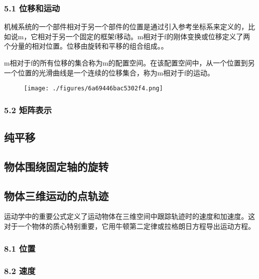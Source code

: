 \subsubsection{5.1 位移和运动}

机械系统的一个部件相对于另一个部件的位置是通过引入参考坐标系来定义的，比如说m，它相对于另一个固定的框架f移动。m相对于f的刚体变换或位移定义了两个分量的相对位置。位移由旋转和平移的组合组成。。

m相对于f的所有位移的集合称为m的配置空间。在该配置空间中，从一个位置到另一个位置的光滑曲线是一个连续的位移集合，称为m相对于f的运动。

\begin{figure}[ht]
\centering
\texttt{[image: ./figures/6a69446bac5302f4.png]}
\caption \label{fig_YDX_2}
\end{figure}

\subsubsection{5.2 矩阵表示}



\subsection{纯平移}



\subsection{ 物体围绕固定轴的旋转}



\subsection{物体三维运动的点轨迹}

运动学中的重要公式定义了运动物体在三维空间中跟踪轨迹时的速度和加速度。这对于一个物体的质心特别重要，它用牛顿第二定律或拉格朗日方程导出运动方程。

\subsubsection{8.1 位置}



\subsubsection{8.2 速度}



